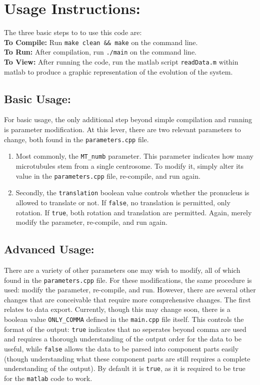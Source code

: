 \documentclass{article}
\begin{document}
\section{Usage Instructions:}
  The three basic steps to to use this code are:\\
  \textbf{To Compile:} Run \texttt{make clean \&\& make} on the command line.\\
  \textbf{To Run:} After compilation, run \texttt{./main} on the command line.\\
  \textbf{To View: } After running the code, run the matlab script
  \texttt{readData.m} within matlab to produce a graphic representation of the
  evolution of the system. 
  \subsection{Basic Usage:}
  For basic usage, the only additional step beyond simple compilation and
  running is parameter modification. At this lever, there are two relevant
  parameters to change, both found in the \texttt{parameters.cpp} file.
  \begin{enumerate}
    \item Most commonly, the \texttt{MT\_numb} parameter. This parameter
      indicates how many microtubules stem from a single centrosome. To modify
      it, simply alter its value in the \texttt{parameters.cpp} file,
      re-compile, and run again.  
    \item Secondly, the \texttt{translation} boolean value controls whether the
      pronucleus is allowed to translate or not. If \texttt{false}, no
      translation is permitted, only rotation. If \texttt{true}, both rotation
      and translation are permitted. Again, merely modify the parameter,
      re-compile, and run again. 
  \end{enumerate}
  \subsection{Advanced Usage:}
  There are a variety of other parameters one may wish to modify, all of which
  found in the \texttt{parameters.cpp} file. For these modifications, the same
  procedure is used: modify the parameter, re-compile, and run. However, there
  are several other changes that are conceivable that require more comprehensive
  changes. The first relates to data export. Currently, though this may change
  soon, there is a boolean value \texttt{ONLY\_COMMA} defined in the
  \texttt{main.cpp} file itself. This controls the format of the output:
  \texttt{true} indicates that no seperates beyond comma are used and requires a
  thorough understanding of the output order for the data to be useful, while
  \texttt{false} allows the data to be parsed into component parts easily
  (though understanding what these component parts are still requires a complete
  understanding of the output). By default it is \texttt{true}, as it is
  required to be true for the \texttt{matlab} code to work. 
\end{document}
